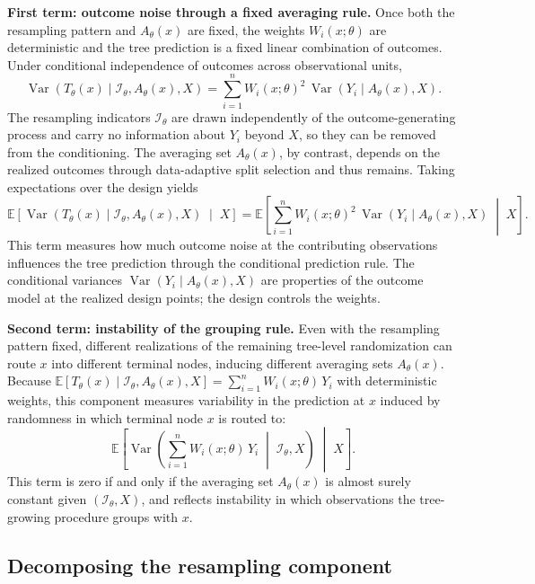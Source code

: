 \documentclass[11pt]{article}
\theoremstyle{plain}
\theoremstyle{definition}
\theoremstyle{remark}
\DeclareMathOperator{\Var}{Var}
\begin{document}
\noindent\textbf{First term: outcome noise through a fixed averaging rule.} Once both the resampling pattern and $A_\theta(x)$ are fixed, the weights $W_i(x;\theta)$ are deterministic and the tree prediction is a fixed linear combination of outcomes. Under conditional independence of outcomes across observational units,
\[
\Var\!\left(T_\theta(x)\mid \mathcal I_\theta, A_\theta(x), X\right)
=
\sum_{i=1}^n W_i(x;\theta)^2\,\Var(Y_i\mid A_\theta(x), X).
\]
The resampling indicators $\mathcal I_\theta$ are drawn independently of the outcome-generating process and carry no information about $Y_i$ beyond $X$, so they can be removed from the conditioning. The averaging set $A_\theta(x)$, by contrast, depends on the realized outcomes through data-adaptive split selection and thus remains. Taking expectations over the design yields
\[
\mathbb E\!\left[
\Var\!\left(T_\theta(x)\mid \mathcal I_\theta, A_\theta(x), X\right)
\;\middle|\;
X
\right]
=
\mathbb E\!\left[
\sum_{i=1}^n W_i(x;\theta)^2\,\Var(Y_i\mid A_\theta(x), X)
\;\middle|\;
X
\right].
\]
This term measures how much outcome noise at the contributing observations influences the tree prediction through the conditional prediction rule. The conditional variances $\Var(Y_i\mid A_\theta(x), X)$ are properties of the outcome model at the realized design points; the design controls the weights. 

\noindent\textbf{Second term: instability of the grouping rule.} Even with the resampling pattern fixed, different realizations of the remaining tree-level randomization can route $x$ into different terminal nodes, inducing different averaging sets $A_\theta(x)$. Because $\mathbb E[T_\theta(x)\mid \mathcal I_\theta, A_\theta(x), X] = \sum_{i=1}^n W_i(x;\theta)\,Y_i$ with deterministic weights, this component measures variability in the prediction at $x$ induced by randomness in which terminal node $x$ is routed to:
\[
\mathbb E\!\left[
\Var\!\left(
\sum_{i=1}^n W_i(x;\theta)\,Y_i
\;\middle|\;
\mathcal I_\theta, X
\right)
\;\middle|\;
X
\right].
\]
This term is zero if and only if the averaging set $A_\theta(x)$ is almost surely constant given $(\mathcal I_\theta, X)$, and reflects instability in which observations the tree-growing procedure groups with $x$.

\subsection{Decomposing the resampling component}
\label{subsec:resampling_component}
\end{document}

